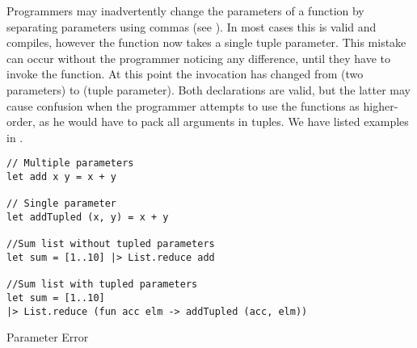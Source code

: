 Programmers may inadvertently change the parameters of a function by separating parameters using commas (see ). In most cases this is valid \fs and compiles, however the function now takes a single tuple parameter. This mistake can occur without the programmer noticing any difference, until they have to invoke the function. At this point the invocation has changed from (two parameters) to (tuple parameter). Both declarations are valid, but the latter may cause confusion when the programmer attempts to use the functions as higher-order, as he would have to pack all arguments in tuples. We have listed examples in .

\begin{listing}[H]
\begin{verbatim}
// Multiple parameters
let add x y = x + y

// Single parameter
let addTupled (x, y) = x + y

//Sum list without tupled parameters
let sum = [1..10] |> List.reduce add

//Sum list with tupled parameters
let sum = [1..10] 
|> List.reduce (fun acc elm -> addTupled (acc, elm)) 
\end{verbatim}
\caption{Parameter Error}
\label{lst:para-err}
\end{listing}
